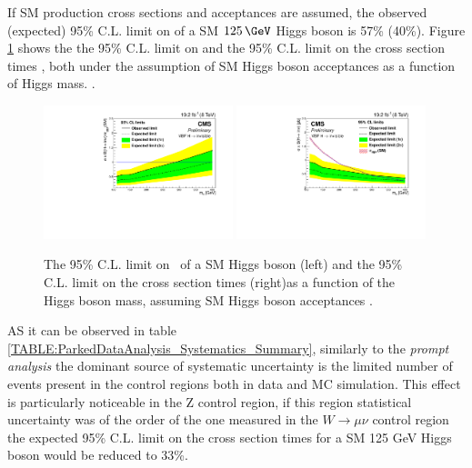 If \gls{SM} production cross sections and acceptances are assumed, the observed (expected) 95\% C.L. limit on \BRinv of a \gls{SM} $125\,\GeV$ Higgs boson is 57\% (40\%). Figure \ref{FIGURE:ParkedDataAnalysis_Limits_VBFLimit} shows the the 95\% C.L. limit on \BRinv and the 95\% C.L. limit on the cross section times \BRinv, both under the assumption of \gls{SM} Higgs boson acceptances as a function of Higgs mass. .

\begin{figure}[h!]
  \begin{center}
    \includegraphics[width=0.49\textwidth]{Chapter07/Images/vbflimit.pdf} %
    \includegraphics[width=0.49\textwidth]{Chapter07/Images/vbfxslimit.pdf}
 \caption{The 95\% C.L. limit on \BRinv\, of a SM Higgs
boson (left) and the 95\% C.L. limit on the cross section times
\BRinv (right)as a function of the Higgs
boson mass, assuming SM Higgs boson acceptances \cite{ARTICLE:CMSVBFHiggsInvisibleParkedAnalysisPAS}.}
    \label{FIGURE:ParkedDataAnalysis_Limits_VBFLimit}
  \end{center}
\end{figure}

AS it can be observed in table \ref{TABLE:ParkedDataAnalysis_Systematics_Summary}, similarly to the \textit{prompt analysis} the dominant source of systematic uncertainty is the limited number of events present in the control regions both in data and \gls{MC} simulation. This effect is particularly noticeable in the Z control region, if this region statistical uncertainty was of the order of the one measured in the $W\rightarrow\mu\nu$ control region the expected 95\% C.L. limit on the cross section times \BRinv for a \gls{SM} 125 GeV Higgs boson would be reduced to 33\%.

